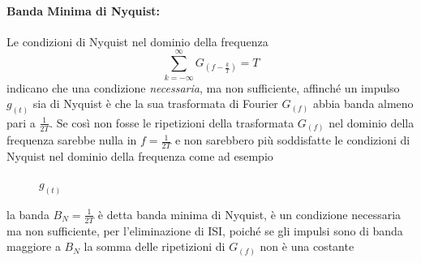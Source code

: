             \paragraph*{Banda Minima di Nyquist:} Le condizioni di Nyquist nel dominio della frequenza
            \[
                \sum_{k= -\infty}^{\infty} G_{(f-\frac{k}{T})} = T
            \]
            indicano che una condizione \emph{necessaria}, ma non sufficiente, affinché un impulso $g_{(t)}$ sia di Nyquist
            è che la sua trasformata di Fourier $G_{(f)}$ abbia banda almeno pari a $\frac{1}{2T}$. Se così non fosse
            le ripetizioni della trasformata $G_{(f)}$ nel dominio della frequenza sarebbe nulla in $f=\frac{1}{2T}$ e non sarebbero
            più soddisfatte le condizioni di Nyquist nel dominio della frequenza come ad esempio
            \begin{figure}[H]
                \centering
                    \caption{$g_{(t)}$}          
            \end{figure}
            la banda $B_N =\frac{1}{2T}$ è detta banda minima di Nyquist, è un condizione necessaria ma non sufficiente, per l'eliminazione di ISI,
            poiché se gli impulsi sono di banda maggiore a $B_N$ la somma delle ripetizioni di $G_{(f)}$ non è una costante
